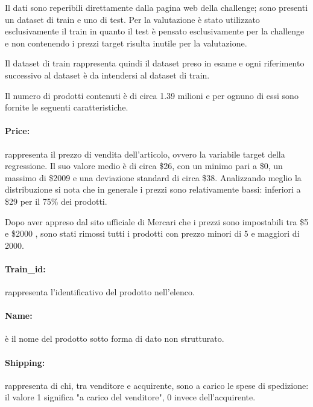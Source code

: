 
Il dati sono reperibili direttamente dalla pagina web della challenge; sono
presenti un dataset di train e uno di test. Per la valutazione è stato utilizzato
esclusivamente il train in quanto il test è pensato esclusivamente per la
challenge e non contenendo i prezzi target risulta inutile per la valutazione.

Il dataset di train rappresenta quindi il dataset preso in esame e ogni
riferimento successivo al dataset è da intendersi al dataset di train.

Il numero di prodotti contenuti è di circa 1.39 milioni e per ognuno di essi
sono fornite le seguenti caratteristiche.

\paragraph{Price:} rappresenta il prezzo di vendita dell'articolo, ovvero la
variabile target della regressione. Il suo valore medio è di circa \$26, con un
minimo pari a \$0, un massimo di \$2009 e una deviazione standard di circa \$38.
Analizzando meglio la distribuzione si nota che in generale i prezzi sono
relativamente bassi: inferiori a \$29 per il 75\% dei prodotti.

Dopo aver appreso dal sito ufficiale di Mercari che i prezzi sono impostabili
tra \$5 e \$2000 \cite{mercari-how-to-set-a-price}, sono stati rimossi tutti i prodotti con prezzo minori di 5 e maggiori di 2000.

\paragraph{Train\_id:} rappresenta l'identificativo del prodotto nell'elenco.

\paragraph{Name:} è il nome del prodotto sotto forma di dato non strutturato.

\paragraph{Shipping:} rappresenta di chi, tra venditore e acquirente, sono a carico
le spese di spedizione: il valore 1 significa "a carico del
venditore", 0 invece dell'acquirente.

